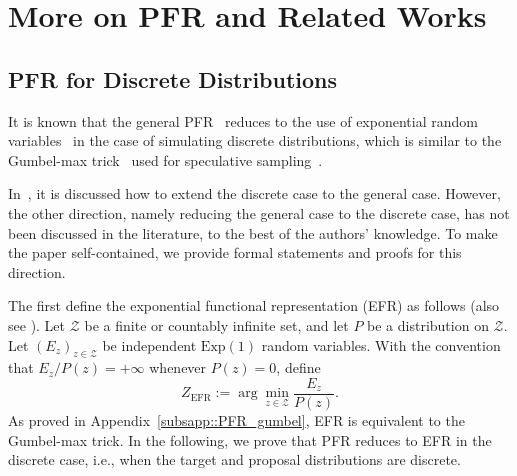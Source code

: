 \documentclass{article}
\theoremstyle{plain}
\theoremstyle{definition}
\begin{document}
\newpage













\newpage



\appendix



\section{More on PFR and Related Works}
\label{app::Poisson}

\subsection{PFR for Discrete Distributions}
\label{subapp:PFR_discrete}

It is known that the general PFR~\citep{li2018strong, li2021unified} reduces to the use of exponential random variables~\citep{li2018strong, liu2025one} in the case of simulating discrete distributions, which is similar to the Gumbel-max trick~\citep{gumbel1954statistical} used for speculative sampling~\citep{kobus2025speculative}.

In~\citep{li2024channel}, it is discussed how to extend the discrete case to the general case. However, the other direction, namely reducing the general case to the discrete case, has not been discussed in the literature, to the best of the authors' knowledge.
To make the paper self-contained, we provide formal statements and proofs for this direction.


The first define the exponential functional representation (EFR) as follows (also see \citep{li2018strong, liu2025one}). 
Let $\mathcal{Z}$ be a finite or countably infinite set, and let $P$ be a distribution on $\mathcal{Z}$. 
Let $(E_z)_{z\in\mathcal{Z}}$ be independent $\mathrm{Exp}(1)$ random variables. 
With the convention that $E_z/P(z)=+\infty$ whenever $P(z)=0$, define
\begin{equation}
    Z_{\mathrm{EFR}}
    :=
    \arg\min_{z\in\mathcal{Z}} \frac{E_z}{P(z)} .
    \label{eq:EFR}
\end{equation}
As proved in Appendix~\ref{subsapp::PFR_gumbel}, EFR is equivalent to the Gumbel-max trick.
In the following, we prove that PFR reduces to EFR in the discrete case, i.e., when the target and proposal distributions are discrete. 
\end{document}
